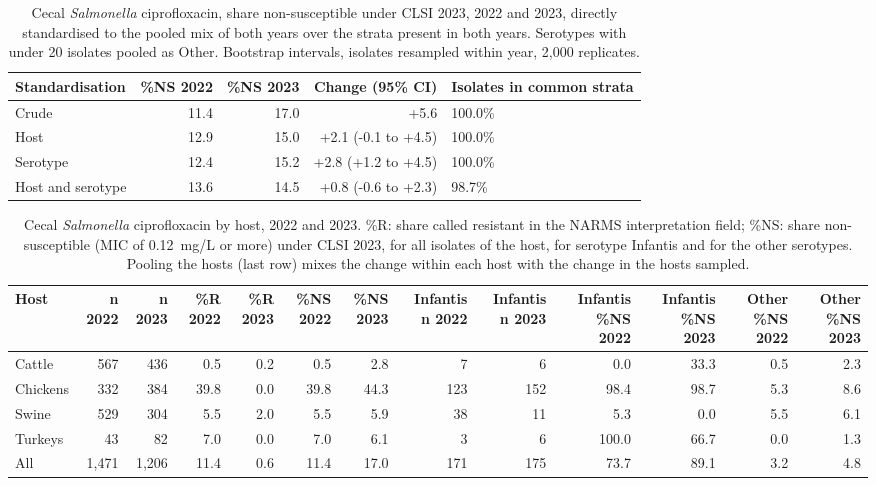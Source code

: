 \begin{table}[h]
\centering
\scriptsize
\begin{tabular}{lrrrl}
\toprule
Standardisation & \%NS 2022 & \%NS 2023 & Change (95\% CI) & Isolates in common strata \\
\midrule
Crude & 11.4 & 17.0 & +5.6 & 100.0\% \\
Host & 12.9 & 15.0 & +2.1 (-0.1 to +4.5) & 100.0\% \\
Serotype & 12.4 & 15.2 & +2.8 (+1.2 to +4.5) & 100.0\% \\
Host and serotype & 13.6 & 14.5 & +0.8 (-0.6 to +2.3) & 98.7\% \\
\bottomrule
\end{tabular}
\caption{Cecal \textit{Salmonella} ciprofloxacin, share non-susceptible under CLSI 2023, 2022 and 2023, directly standardised to the pooled mix of both years over the strata present in both years. Serotypes with under 20 isolates pooled as Other. Bootstrap intervals, isolates resampled within year, 2,000 replicates.}
\end{table}

\begin{table}[h]
\centering
\scriptsize
\begin{tabular}{lrrrrrrrrrrrr}
\toprule
Host & n 2022 & n 2023 & \%R 2022 & \%R 2023 & \%NS 2022 & \%NS 2023 & Infantis n 2022 & Infantis n 2023 & Infantis \%NS 2022 & Infantis \%NS 2023 & Other \%NS 2022 & Other \%NS 2023 \\
\midrule
Cattle &   567 &   436 & 0.5 & 0.2 & 0.5 & 2.8 & 7 & 6 & 0.0 & 33.3 & 0.5 & 2.3 \\
Chickens &   332 &   384 & 39.8 & 0.0 & 39.8 & 44.3 & 123 & 152 & 98.4 & 98.7 & 5.3 & 8.6 \\
Swine &   529 &   304 & 5.5 & 2.0 & 5.5 & 5.9 & 38 & 11 & 5.3 & 0.0 & 5.5 & 6.1 \\
Turkeys &    43 &    82 & 7.0 & 0.0 & 7.0 & 6.1 & 3 & 6 & 100.0 & 66.7 & 0.0 & 1.3 \\
All & 1,471 & 1,206 & 11.4 & 0.6 & 11.4 & 17.0 & 171 & 175 & 73.7 & 89.1 & 3.2 & 4.8 \\
\bottomrule
\end{tabular}
\caption{Cecal \textit{Salmonella} ciprofloxacin by host, 2022 and 2023. \%R: share called resistant in the NARMS interpretation field; \%NS: share non-susceptible (MIC of 0.12~mg/L or more) under CLSI 2023, for all isolates of the host, for serotype Infantis and for the other serotypes. Pooling the hosts (last row) mixes the change within each host with the change in the hosts sampled.}
\end{table}

